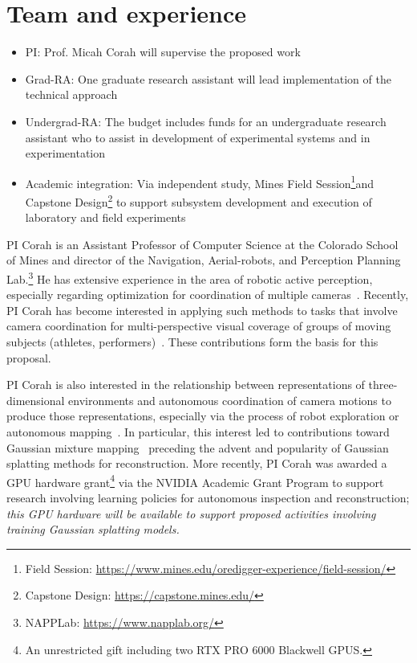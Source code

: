 \documentclass[11pt]{article}
\begin{document}
\section{Team and experience}

\noindent
\begin{itemize}[itemsep=0.3ex,topsep=0.3ex]
  \item PI: Prof. Micah Corah will supervise the proposed work
  \item Grad-RA: One graduate research assistant will lead implementation of the
    technical approach
  \item Undergrad-RA: The budget includes funds for an undergraduate
    research assistant who to assist in development of experimental systems
    and in experimentation
  \item Academic integration: Via independent study, Mines Field Session\footnote{%
      Field Session:
      \url{https://www.mines.edu/oredigger-experience/field-session/}
    }and Capstone Design\footnote{%
      Capstone Design: \url{https://capstone.mines.edu/}
    }
    to support subsystem development and execution of laboratory and field
    experiments
\end{itemize}

PI Corah is an Assistant Professor of Computer Science at the Colorado
School of Mines and director of the
Navigation, Aerial-robots, and Perception Planning Lab.\footnote{%
  NAPPLab: \url{https://www.napplab.org/}
}
He has extensive experience in the area of robotic active perception, especially
regarding optimization for coordination of multiple
cameras~\citep{corah2019auro,corah2018cdc,corah2021iros}.
Recently, PI Corah has become interested in applying such methods to tasks that
involve camera coordination for multi-perspective visual coverage of groups of
moving subjects (athletes,
performers)~\citep{suresh2024iros,hughes2024cdc,bouy2026}.
These contributions form the basis for this proposal.

PI Corah is also interested in the relationship between representations of
three-dimensional environments and autonomous coordination of camera motions to
produce those representations, especially via the process of robot exploration
or autonomous
mapping~\citep{corah2019ral,corah2021icra,corah2019auro,goel2019fsr,kim2023ral}.
In particular, this interest led to contributions toward Gaussian mixture
mapping~\citep{corah2019ral} preceding the advent and popularity of Gaussian
splatting methods for reconstruction.
More recently, PI Corah was awarded a GPU hardware grant\footnote{
  An unrestricted gift including two RTX PRO 6000 Blackwell GPUS.
} via the NVIDIA Academic Grant Program to support
research involving learning policies for autonomous
inspection and reconstruction; \emph{this GPU hardware will be available to
support proposed activities involving training Gaussian splatting models.}
\end{document}
